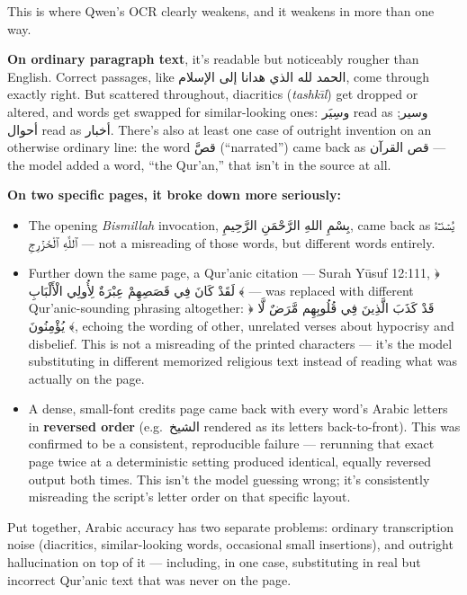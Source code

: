 \documentclass[11pt]{article}
\begin{document}
This is where Qwen's OCR clearly weakens, and it weakens in more than one way.

\textbf{On ordinary paragraph text}, it's readable but noticeably rougher than English.
Correct passages, like \textarabic{الحمد لله الذي هدانا إلى الإسلام}, come through exactly
right. But scattered throughout, diacritics (\emph{tashk\={\i}l}) get dropped or altered, and
words get swapped for similar-looking ones: \textarabic{وسِيَر} read as \textarabic{وسير};
\textarabic{أحوال} read as \textarabic{أخبار}. There's also at least one case of outright
invention on an otherwise ordinary line: the word \textarabic{قصَّ} (``narrated'') came back
as \textarabic{قص القرآن} --- the model added a word, ``the Qur'an,'' that isn't in the
source at all.

\textbf{On two specific pages, it broke down more seriously:}

\begin{itemize}
    \item The opening \emph{Bismillah} invocation, \textarabic{بِسْمِ اللهِ الرَّحْمَنِ
        الرَّحِيمِ}, came back as \textarabic{يُسۡنَـٰٓءُ ٱللَّهِ ٱلْخَزۡرِجِ} --- not a
        misreading of those words, but different words entirely.
    \item Further down the same page, a Qur'anic citation --- Surah Y\={u}suf 12:111,
        \textarabic{﴿ لَقَدْ كَانَ فِي قَصَصِهِمْ عِبْرَةٌ لِأُولِي الْأَلْبَابِ ﴾} --- was
        replaced with different Qur'anic-sounding phrasing altogether:
        \textarabic{﴿ قَدْ كَذَبَ الَّذِينَ فِي قُلُوبِهِم مَّرَضٌ لَّا يُؤْمِنُونَ ﴾},
        echoing the wording of other, unrelated verses about hypocrisy and disbelief. This
        is not a misreading of the printed characters --- it's the model substituting in
        different memorized religious text instead of reading what was actually on the
        page.
    \item A dense, small-font credits page came back with every word's Arabic letters in
        \textbf{reversed order} (e.g.\ \textarabic{الشيخ} rendered as its letters
        back-to-front). This was confirmed to be a consistent, reproducible failure ---
        rerunning that exact page twice at a deterministic setting produced identical,
        equally reversed output both times. This isn't the model guessing wrong; it's
        consistently misreading the script's letter order on that specific layout.
\end{itemize}

Put together, Arabic accuracy has two separate problems: ordinary transcription noise
(diacritics, similar-looking words, occasional small insertions), and outright hallucination
on top of it --- including, in one case, substituting in real but incorrect Qur'anic text
that was never on the page.
\end{document}
